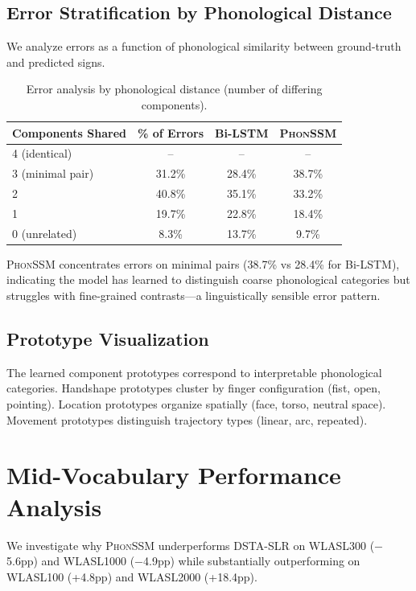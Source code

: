 \documentclass[sigconf,nonacm,anonymous]{acmart}
\theoremstyle{definition}
\theoremstyle{remark}
\newcommand{\phonssm}{\textsc{PhonSSM}}
\begin{document}
\subsection{Error Stratification by Phonological Distance}

We analyze errors as a function of phonological similarity between ground-truth and predicted signs.

\begin{table}[ht]
\caption{Error analysis by phonological distance (number of differing components).}
\label{tab:error_distance}
\begin{center}
\small
\begin{tabular}{lccc}
\toprule
Components Shared & \% of Errors & Bi-LSTM & \phonssm{} \\
\midrule
4 (identical) & -- & -- & -- \\
3 (minimal pair) & 31.2\% & 28.4\% & 38.7\% \\
2 & 40.8\% & 35.1\% & 33.2\% \\
1 & 19.7\% & 22.8\% & 18.4\% \\
0 (unrelated) & 8.3\% & 13.7\% & 9.7\% \\
\bottomrule
\end{tabular}
\end{center}
\end{table}

\phonssm{} concentrates errors on minimal pairs (38.7\% vs 28.4\% for Bi-LSTM), indicating the model has learned to distinguish coarse phonological categories but struggles with fine-grained contrasts---a linguistically sensible error pattern.

\subsection{Prototype Visualization}

The learned component prototypes correspond to interpretable phonological categories. Handshape prototypes cluster by finger configuration (fist, open, pointing). Location prototypes organize spatially (face, torso, neutral space). Movement prototypes distinguish trajectory types (linear, arc, repeated).

\section{Mid-Vocabulary Performance Analysis}
\label{app:midvocab}

We investigate why \phonssm{} underperforms DSTA-SLR on WLASL300 ($-$5.6pp) and WLASL1000 ($-$4.9pp) while substantially outperforming on WLASL100 (+4.8pp) and WLASL2000 (+18.4pp).
\end{document}
